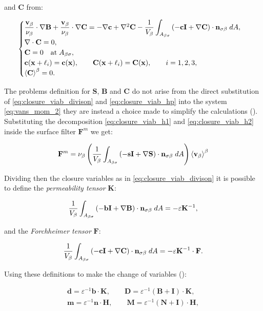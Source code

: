 and $\mathbf{C}$ from:

\begin{eqnarray}
	\begin{cases}
		\dfrac{\textbf{v}_{\beta}}{\nu_{\beta}} \cdot  \nabla \mathbf{B} +\dfrac{\textbf{v}_{\beta}}{\nu_{\beta}} \cdot  \nabla \mathbf{C} = -\nabla \mathbf{c} +  \nabla^2 \mathbf{C} - \dfrac{1}{V_\beta} \displaystyle \int_{A_{\beta \sigma}}  \left(-\mathbf{c}\mathbf{I}  +  \nabla \mathbf{C} \right) \cdot \mathbf{n}_{\sigma \beta} \;dA,  \\
		\nabla \cdot \mathbf{C} = 0, \\
		\mathbf{C} = 0 \quad \textrm{at} \; A_{\beta \sigma}, \\
		\mathbf{c}(\mathbf{x} +\ell_i) = \mathbf{c}(\mathbf{x}), \qquad \mathbf{C}(\mathbf{x} +\ell_i) = \mathbf{C}(\mathbf{x}), \qquad i=1,2,3 ,\\
		{\left< \mathbf{C} \right>}^{\beta} = 0.
	\end{cases}
\label{eq:C_problem}
\end{eqnarray}

The problems definition for $\mathbf{S}$, $\mathbf{B}$ and $\mathbf{C}$ do not arise from the direct substitution of \eqref{eq:closure_viab_divison} and 	\eqref{eq:closure_viab_hp} into the system \eqref{eq:vans_mom_2} they are instead a choice made to simplify the calculations (\citet{whitaker1996forchheimer}). Substituting the decomposition \eqref{eq:closure_viab_h1} and \eqref{eq:closure_viab_h2} inside the surface filter $\mathbf{F}^m$ we get:

$$
\mathbf{F}^m = \nu_{\beta} \left(\dfrac{1}{V_\beta} \int_{A_{\beta \sigma}}  \left(-\mathbf{s}\mathbf{I}  +  \nabla \mathbf{S} \right) \cdot \mathbf{n}_{\sigma \beta} \;dA \right) {\left< \textbf{v}_{\beta} \right>}^{\beta}
$$

\noindent Dividing then the closure variables as in \eqref{eq:closure_viab_divison} it is possible to define the \textit{permeability tensor} $\mathbf{K}$:

$$
 \dfrac{1}{V_\beta} \int_{A_{\beta \sigma}}  \left(-\mathbf{b}\mathbf{I}  +  \nabla \mathbf{B} \right) \cdot \mathbf{n}_{\sigma \beta} \;dA = -\varepsilon \mathbf{K}^{-1},
$$

\noindent and the \textit{Forchheimer tensor} $\mathbf{F}$:

$$
\dfrac{1}{V_\beta} \int_{A_{\beta \sigma}} \left(-\mathbf{c}\mathbf{I}  +  \nabla \mathbf{C} \right) \cdot \mathbf{n}_{\sigma \beta} \;dA = -\varepsilon \mathbf{K}^{-1} \cdot \mathbf{F}.
$$

\noindent Using these definitions to make the change of variables (\citet{barrere1992closure}):


\begin{eqnarray}
	\mathbf{d} = \varepsilon^{-1} \mathbf{b} \cdot \mathbf{K}, \qquad \mathbf{D} = \varepsilon^{-1} \left(\mathbf{B} + \mathbf{I} \right)\cdot \mathbf{K}, \\
\mathbf{m} = \varepsilon^{-1} \mathbf{n} \cdot \mathbf{H}, \qquad \mathbf{M} = \varepsilon^{-1} \left(\mathbf{N} + \mathbf{I} \right)\cdot \mathbf{H}, \label{eq:barrere2}
\end{eqnarray}


